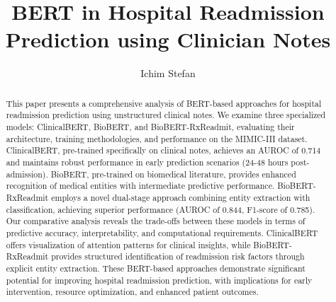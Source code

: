 \documentclass[3p,times,procedia]{elsarticle}
\begin{document}
\begin{frontmatter}



%


\title{\textbf{BERT in Hospital Readmission Prediction using Clinician Notes}}




\author{Ichim Stefan} 

\begin{abstract}

This paper presents a comprehensive analysis of BERT-based approaches for hospital readmission prediction using unstructured clinical notes. We examine three specialized models: ClinicalBERT, BioBERT, and BioBERT-RxReadmit, evaluating their architecture, training methodologies, and performance on the MIMIC-III dataset. ClinicalBERT, pre-trained specifically on clinical notes, achieves an AUROC of 0.714 and maintains robust performance in early prediction scenarios (24-48 hours post-admission). BioBERT, pre-trained on biomedical literature, provides enhanced recognition of medical entities with intermediate predictive performance. BioBERT-RxReadmit employs a novel dual-stage approach combining entity extraction with classification, achieving superior performance (AUROC of 0.844, F1-score of 0.785). Our comparative analysis reveals the trade-offs between these models in terms of predictive accuracy, interpretability, and computational requirements. ClinicalBERT offers visualization of attention patterns for clinical insights, while BioBERT-RxReadmit provides structured identification of readmission risk factors through explicit entity extraction. These BERT-based approaches demonstrate significant potential for improving hospital readmission prediction, with implications for early intervention, resource optimization, and enhanced patient outcomes.
\end{abstract}


\end{frontmatter}
\end{document}
